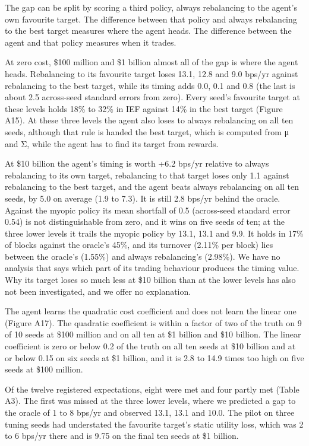 \documentclass[
  11pt]{article}
\begin{document}
The gap can be split by scoring a third policy, always rebalancing to
the agent's own favourite target. The difference between that policy and
always rebalancing to the best target measures where the agent heads.
The difference between the agent and that policy measures when it
trades.

At zero cost, \$100 million and \$1 billion almost all of the gap is
where the agent heads. Rebalancing to its favourite target loses 13.1,
12.8 and 9.0 bps/yr against rebalancing to the best target, while its
timing adds 0.0, 0.1 and 0.8 (the last is about 2.5 across-seed standard
errors from zero). Every seed's favourite target at these levels holds
18\% to 32\% in IEF against 14\% in the best target (Figure A15). At
these three levels the agent also loses to always rebalancing on all ten
seeds, although that rule is handed the best target, which is computed
from μ and Σ, while the agent has to find its target from rewards.

At \$10 billion the agent's timing is worth +6.2 bps/yr relative to
always rebalancing to its own target, rebalancing to that target loses
only 1.1 against rebalancing to the best target, and the agent beats
always rebalancing on all ten seeds, by 5.0 on average (1.9 to 7.3). It
is still 2.8 bps/yr behind the oracle. Against the myopic policy its
mean shortfall of 0.5 (across-seed standard error 0.54) is not
distinguishable from zero, and it wins on five seeds of ten; at the
three lower levels it trails the myopic policy by 13.1, 13.1 and 9.9. It
holds in 17\% of blocks against the oracle's 45\%, and its turnover
(2.11\% per block) lies between the oracle's (1.55\%) and always
rebalancing's (2.98\%). We have no analysis that says which part of its
trading behaviour produces the timing value. Why its target loses so
much less at \$10 billion than at the lower levels has also not been
investigated, and we offer no explanation.

The agent learns the quadratic cost coefficient and does not learn the
linear one (Figure A17). The quadratic coefficient is within a factor of
two of the truth on 9 of 10 seeds at \$100 million and on all ten at \$1
billion and \$10 billion. The linear coefficient is zero or below 0.2 of
the truth on all ten seeds at \$10 billion and at or below 0.15 on six
seeds at \$1 billion, and it is 2.8 to 14.9 times too high on five seeds
at \$100 million.

Of the twelve registered expectations, eight were met and four partly
met (Table A3). The first was missed at the three lower levels, where we
predicted a gap to the oracle of 1 to 8 bps/yr and observed 13.1, 13.1
and 10.0. The pilot on three tuning seeds had understated the favourite
target's static utility loss, which was 2 to 6 bps/yr there and is 9.75
on the final ten seeds at \$1 billion.
\end{document}
